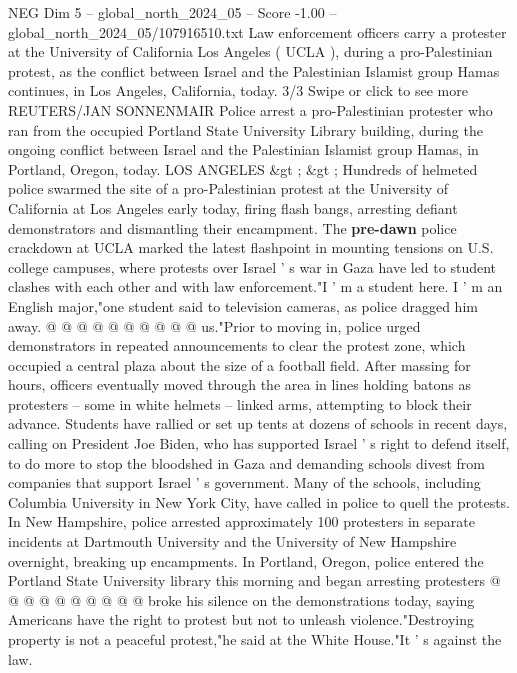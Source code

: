 \begin{textsample}{NEG Dim 5 – global\_north\_2024\_05 – Score -1.00 – global\_north\_2024\_05/107916510.txt}  \label{ex:f5_neg_281}
Law enforcement officers carry a protester at the University of California Los Angeles ( UCLA ), during a pro-Palestinian protest, as the conflict between Israel and the Palestinian Islamist group Hamas continues, in Los Angeles, California, today. 3/3 Swipe or click to see more REUTERS/JAN SONNENMAIR Police arrest a pro-Palestinian protester who ran from the occupied Portland State University Library building, during the ongoing conflict between Israel and the Palestinian Islamist group Hamas, in Portland, Oregon, today.
LOS ANGELES \&gt ; \&gt ; Hundreds of helmeted police swarmed the site of a pro-Palestinian protest at the University of California at Los Angeles early today, firing flash bangs, arresting defiant demonstrators and dismantling their encampment.
The \textbf{pre-dawn} police crackdown at UCLA marked the latest flashpoint in mounting tensions on U.S. college campuses, where protests over Israel ' s war in Gaza have led to student clashes with each other and with law enforcement."I ' m a student here.
I ' m an English major,"one student said to television cameras, as police dragged him away. @ @ @ @ @ @ @ @ @ @ us."Prior to moving in, police urged demonstrators in repeated announcements to clear the protest zone, which occupied a central plaza about the size of a football field.
After massing for hours, officers eventually moved through the area in lines holding batons as protesters -- some in white helmets -- linked arms, attempting to block their advance.
Students have rallied or set up tents at dozens of schools in recent days, calling on President Joe Biden, who has supported Israel ' s right to defend itself, to do more to stop the bloodshed in Gaza and demanding schools divest from companies that support Israel ' s government.
Many of the schools, including Columbia University in New York City, have called in police to quell the protests.
In New Hampshire, police arrested approximately 100 protesters in separate incidents at Dartmouth University and the University of New Hampshire overnight, breaking up encampments.
In Portland, Oregon, police entered the Portland State University library this morning and began arresting protesters @ @ @ @ @ @ @ @ @ @ broke his silence on the demonstrations today, saying Americans have the right to protest but not to unleash violence."Destroying property is not a peaceful protest,"he said at the White House."It ' s against the law.

\end{textsample}

